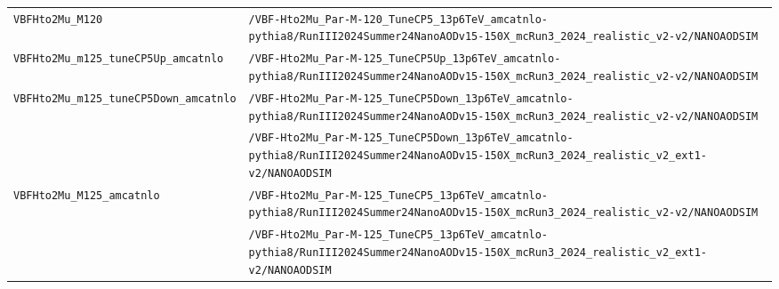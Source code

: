 \begin{longtable}{@{}>{\RaggedRight\arraybackslash}p{} >{\RaggedRight\arraybackslash}p{}@{}}
\addlinespace[2pt]
\texttt{VBFHto2Mu\_\allowbreak{}M120} & \texttt{/\allowbreak{}VBF-\allowbreak{}Hto2Mu\_\allowbreak{}Par-\allowbreak{}M-\allowbreak{}120\_\allowbreak{}TuneCP5\_\allowbreak{}13p6TeV\_\allowbreak{}amcatnlo-\allowbreak{}pythia8/\allowbreak{}RunIII2024Summer24NanoAODv15-\allowbreak{}150X\_\allowbreak{}mcRun3\_\allowbreak{}2024\_\allowbreak{}realistic\_\allowbreak{}v2-\allowbreak{}v2/\allowbreak{}NANOAODSIM} \\
\addlinespace[2pt]
\texttt{VBFHto2Mu\_\allowbreak{}m125\_\allowbreak{}tuneCP5Up\_\allowbreak{}amcatnlo} & \texttt{/\allowbreak{}VBF-\allowbreak{}Hto2Mu\_\allowbreak{}Par-\allowbreak{}M-\allowbreak{}125\_\allowbreak{}TuneCP5Up\_\allowbreak{}13p6TeV\_\allowbreak{}amcatnlo-\allowbreak{}pythia8/\allowbreak{}RunIII2024Summer24NanoAODv15-\allowbreak{}150X\_\allowbreak{}mcRun3\_\allowbreak{}2024\_\allowbreak{}realistic\_\allowbreak{}v2-\allowbreak{}v2/\allowbreak{}NANOAODSIM} \\
\addlinespace[2pt]
\texttt{VBFHto2Mu\_\allowbreak{}m125\_\allowbreak{}tuneCP5Down\_\allowbreak{}amcatnlo} & \texttt{/\allowbreak{}VBF-\allowbreak{}Hto2Mu\_\allowbreak{}Par-\allowbreak{}M-\allowbreak{}125\_\allowbreak{}TuneCP5Down\_\allowbreak{}13p6TeV\_\allowbreak{}amcatnlo-\allowbreak{}pythia8/\allowbreak{}RunIII2024Summer24NanoAODv15-\allowbreak{}150X\_\allowbreak{}mcRun3\_\allowbreak{}2024\_\allowbreak{}realistic\_\allowbreak{}v2-\allowbreak{}v2/\allowbreak{}NANOAODSIM} \\
 & \texttt{/\allowbreak{}VBF-\allowbreak{}Hto2Mu\_\allowbreak{}Par-\allowbreak{}M-\allowbreak{}125\_\allowbreak{}TuneCP5Down\_\allowbreak{}13p6TeV\_\allowbreak{}amcatnlo-\allowbreak{}pythia8/\allowbreak{}RunIII2024Summer24NanoAODv15-\allowbreak{}150X\_\allowbreak{}mcRun3\_\allowbreak{}2024\_\allowbreak{}realistic\_\allowbreak{}v2\_\allowbreak{}ext1-\allowbreak{}v2/\allowbreak{}NANOAODSIM} \\
\addlinespace[2pt]
\texttt{VBFHto2Mu\_\allowbreak{}M125\_\allowbreak{}amcatnlo} & \texttt{/\allowbreak{}VBF-\allowbreak{}Hto2Mu\_\allowbreak{}Par-\allowbreak{}M-\allowbreak{}125\_\allowbreak{}TuneCP5\_\allowbreak{}13p6TeV\_\allowbreak{}amcatnlo-\allowbreak{}pythia8/\allowbreak{}RunIII2024Summer24NanoAODv15-\allowbreak{}150X\_\allowbreak{}mcRun3\_\allowbreak{}2024\_\allowbreak{}realistic\_\allowbreak{}v2-\allowbreak{}v2/\allowbreak{}NANOAODSIM} \\
 & \texttt{/\allowbreak{}VBF-\allowbreak{}Hto2Mu\_\allowbreak{}Par-\allowbreak{}M-\allowbreak{}125\_\allowbreak{}TuneCP5\_\allowbreak{}13p6TeV\_\allowbreak{}amcatnlo-\allowbreak{}pythia8/\allowbreak{}RunIII2024Summer24NanoAODv15-\allowbreak{}150X\_\allowbreak{}mcRun3\_\allowbreak{}2024\_\allowbreak{}realistic\_\allowbreak{}v2\_\allowbreak{}ext1-\allowbreak{}v2/\allowbreak{}NANOAODSIM} \\

\end{longtable}
